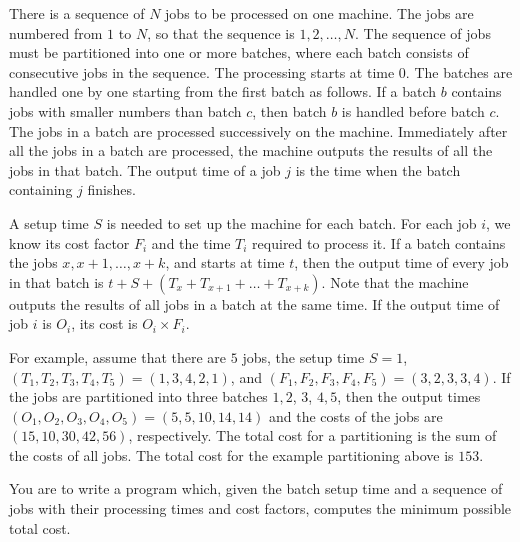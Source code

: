 There is a sequence of $N$ jobs to be processed on one machine. The jobs are numbered
from $1$ to $N$, so that the sequence is $1,2, \ldots, N$. The sequence of jobs must be partitioned into one or more batches, where each batch consists of consecutive jobs in the sequence. The processing starts at time $0$. The batches are handled one by one starting from the first batch as follows. If a batch $b$ contains jobs with smaller numbers than batch $c$, then batch $b$ is handled before batch $c$. The jobs in a batch are processed successively on the machine. Immediately after all the jobs in a batch are processed, the machine outputs the results of all the jobs in that batch. The output time of a job $j$ is the time when the batch containing $j$ finishes.

A setup time $S$ is needed to set up the machine for each batch. For each job $i$, we know
its cost factor $F_i$ and the time $T_i$ required to process it. If a batch contains the jobs $x, x+1, \ldots , x+k$, and starts at time $t$, then the output time of every job in that batch is $t + S + (T_x + T_{x+1} + \ldots + T_{x+k})$. Note that the machine outputs the results of all jobs in a batch at the same time. If the output time of job $i$ is $O_i$, its cost is $O_i \times F_i$. 

For example, assume that there are $5$ jobs, the setup time $S = 1$, $(T_1, T_2, T_3, T_4, T_5) = (1, 3, 4, 2, 1)$, and $(F_1, F_2, F_3, F_4, F_5) = (3, 2, 3, 3, 4)$. If the jobs are partitioned into three batches ${1, 2}$, ${3}$, ${4, 5}$, then the output times $(O_1, O_2, O_3, O_4, O_5) = (5, 5, 10, 14, 14)$ and the costs of the jobs are $(15, 10, 30, 42, 56)$, respectively. The total cost for a partitioning is the sum of the costs of all jobs. The total cost for the example partitioning above is $153$.

You are to write a program which, given the batch setup time and a sequence of jobs
with their processing times and cost factors, computes the minimum possible total cost.